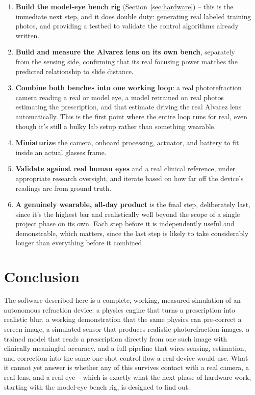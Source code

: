 \documentclass[11pt]{article}
\begin{document}
\begin{enumerate}
  \item \textbf{Build the model-eye bench rig} (Section~\ref{sec:hardware}) -- this is the immediate next step, and it does double duty: generating real labeled training photos, and providing a testbed to validate the control algorithms already written.
  \item \textbf{Build and measure the Alvarez lens on its own bench}, separately from the sensing side, confirming that its real focusing power matches the predicted relationship to slide distance.
  \item \textbf{Combine both benches into one working loop}: a real photorefraction camera reading a real or model eye, a model retrained on real photos estimating the prescription, and that estimate driving the real Alvarez lens automatically. This is the first point where the entire loop runs for real, even though it's still a bulky lab setup rather than something wearable.
  \item \textbf{Miniaturize} the camera, onboard processing, actuator, and battery to fit inside an actual glasses frame.
  \item \textbf{Validate against real human eyes} and a real clinical reference, under appropriate research oversight, and iterate based on how far off the device's readings are from ground truth.
  \item \textbf{A genuinely wearable, all-day product} is the final step, deliberately last, since it's the highest bar and realistically well beyond the scope of a single project phase on its own. Each step before it is independently useful and demonstrable, which matters, since the last step is likely to take considerably longer than everything before it combined.
\end{enumerate}

\section{Conclusion}

The software described here is a complete, working, measured simulation of an autonomous refraction device: a physics engine that turns a prescription into realistic blur, a working demonstration that the same physics can pre-correct a screen image, a simulated sensor that produces realistic photorefraction images, a trained model that reads a prescription directly from one such image with clinically meaningful accuracy, and a full pipeline that wires sensing, estimation, and correction into the same one-shot control flow a real device would use. What it cannot yet answer is whether any of this survives contact with a real camera, a real lens, and a real eye -- which is exactly what the next phase of hardware work, starting with the model-eye bench rig, is designed to find out.



\end{document}
